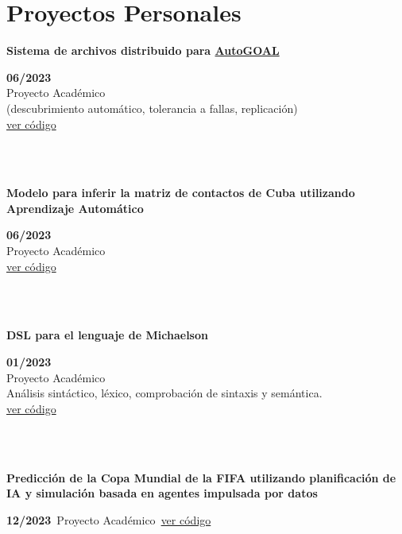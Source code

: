 \documentclass{article}
\begin{document}
\section*{Proyectos Personales}
\begin{minipage}{0.8\textwidth}
\parbox{0.8\linewidth}{\textbf{Sistema de archivos distribuido para \href{https://autogoal.github.io/}{AutoGOAL}}}\hfill \textbf{06/2023} \\
Proyecto Académico\\
(descubrimiento automático, tolerancia a fallas, replicación)\\
\href{https://github.com/geeksLabTech/kade-drive}{ver código}\\
\end{minipage} \hfill {}\\\\
\begin{minipage}{0.8\textwidth}
\parbox{0.8\linewidth}{\textbf{Modelo para inferir la matriz de contactos de Cuba utilizando Aprendizaje Automático}} \hfill \textbf{06/2023}\\
Proyecto Académico\\
\href{https://github.com/geeksLabTech/epidemic-classification-ml-project}{ver código}\\
\end{minipage} \hfill {}\\\\
\begin{minipage}{0.8\textwidth}
\parbox{0.8\linewidth}{\textbf{DSL para el lenguaje de Michaelson}} \hfill \textbf{01/2023}\\
Proyecto Académico\\
Análisis sintáctico, léxico, comprobación de sintaxis y semántica.\\
\href{https://github.com/geeksLabTech/compilation-dsl-project}{ver código}\\
\end{minipage} \hfill {}\\\\
\begin{minipage}{0.8\textwidth}
\parbox{0.8\linewidth}{\textbf{Predicción de la Copa Mundial de la FIFA utilizando planificación de IA y simulación basada en agentes impulsada por datos}} \hfill \textbf{12/2023}\
Proyecto Académico\
\href{https://github.com/geeksLabTech/FIFA_World_Cup_2022}{ver código}\\
\end{minipage} \hfill {}\\\\
\end{document}
